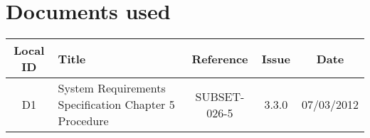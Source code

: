\section{Documents used}
\begin{tabular}{|c|p{5cm}|c|c|c|}
\hline
Local ID & Title & Reference & Issue & Date \\ \hline
D1 & System Requirements Specification Chapter 5 Procedure & SUBSET-026-5 & 3.3.0 & 07/03/2012 \\
\hline
\end{tabular}
